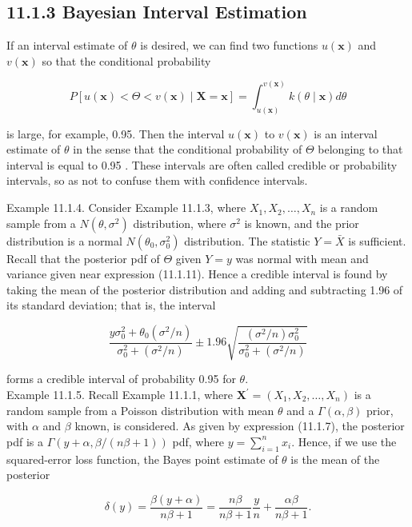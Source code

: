 \subsection*{11.1.3 Bayesian Interval Estimation}
If an interval estimate of $\theta$ is desired, we can find two functions $u(\mathbf{x})$ and $v(\mathbf{x})$ so that the conditional probability

$$
P[u(\mathbf{x})<\Theta<v(\mathbf{x}) \mid \mathbf{X}=\mathbf{x}]=\int_{u(\mathbf{x})}^{v(\mathbf{x})} k(\theta \mid \mathbf{x}) d \theta
$$

is large, for example, 0.95. Then the interval $u(\mathbf{x})$ to $v(\mathbf{x})$ is an interval estimate of $\theta$ in the sense that the conditional probability of $\Theta$ belonging to that interval is equal to 0.95 . These intervals are often called credible or probability intervals, so as not to confuse them with confidence intervals.

Example 11.1.4. Consider Example 11.1.3, where $X_{1}, X_{2}, \ldots, X_{n}$ is a random sample from a $N\left(\theta, \sigma^{2}\right)$ distribution, where $\sigma^{2}$ is known, and the prior distribution is a normal $N\left(\theta_{0}, \sigma_{0}^{2}\right)$ distribution. The statistic $Y=\bar{X}$ is sufficient. Recall that the posterior pdf of $\Theta$ given $Y=y$ was normal with mean and variance given near expression (11.1.11). Hence a credible interval is found by taking the mean of the posterior distribution and adding and subtracting 1.96 of its standard deviation; that is, the interval

$$
\frac{y \sigma_{0}^{2}+\theta_{0}\left(\sigma^{2} / n\right)}{\sigma_{0}^{2}+\left(\sigma^{2} / n\right)} \pm 1.96 \sqrt{\frac{\left(\sigma^{2} / n\right) \sigma_{0}^{2}}{\sigma_{0}^{2}+\left(\sigma^{2} / n\right)}}
$$

forms a credible interval of probability 0.95 for $\theta$.\\
Example 11.1.5. Recall Example 11.1.1, where $\mathbf{X}^{\prime}=\left(X_{1}, X_{2}, \ldots, X_{n}\right)$ is a random sample from a Poisson distribution with mean $\theta$ and a $\Gamma(\alpha, \beta)$ prior, with $\alpha$ and $\beta$ known, is considered. As given by expression (11.1.7), the posterior pdf is a $\Gamma(y+\alpha, \beta /(n \beta+1))$ pdf, where $y=\sum_{i=1}^{n} x_{i}$. Hence, if we use the squared-error loss function, the Bayes point estimate of $\theta$ is the mean of the posterior

$$
\delta(y)=\frac{\beta(y+\alpha)}{n \beta+1}=\frac{n \beta}{n \beta+1} \frac{y}{n}+\frac{\alpha \beta}{n \beta+1} .
$$

